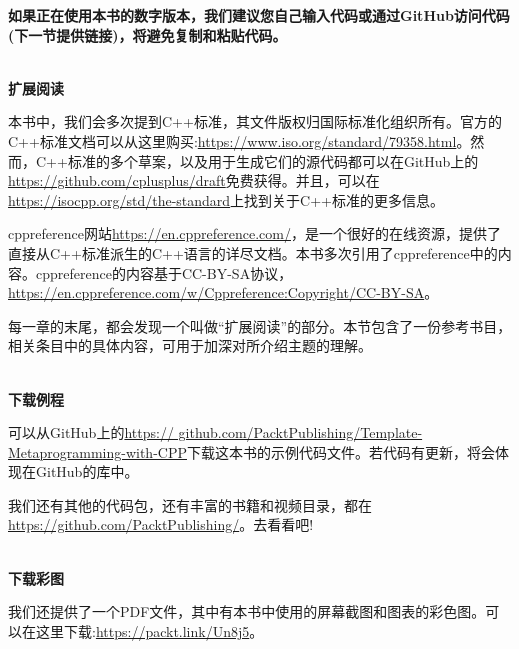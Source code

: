 \textbf{
如果正在使用本书的数字版本，我们建议您自己输入代码或通过GitHub访问代码(下一节提供链接)，将避免复制和粘贴代码。
}

\hspace*{\fill} \\ %
\noindent
\textbf{扩展阅读}

本书中，我们会多次提到C++标准，其文件版权归国际标准化组织所有。官方的C++标准文档可以从这里购买:\url{https://www.iso.org/standard/79358.html}。然而，C++标准的多个草案，以及用于生成它们的源代码都可以在GitHub上的\url{https://github.com/cplusplus/draft}免费获得。并且，可以在\url{https://isocpp.org/std/the-standard}上找到关于C++标准的更多信息。

cppreference网站\url{https://en.cppreference.com/}，是一个很好的在线资源，提供了直接从C++标准派生的C++语言的详尽文档。本书多次引用了cppreference中的内容。cppreference的内容基于CC-BY-SA协议，\url{https://en.cppreference.com/w/Cppreference:Copyright/CC-BY-SA}。

每一章的末尾，都会发现一个叫做“扩展阅读”的部分。本节包含了一份参考书目，相关条目中的具体内容，可用于加深对所介绍主题的理解。

\hspace*{\fill} \\ %
\noindent
\textbf{下载例程}

可以从GitHub上的\url{https:// github.com/PacktPublishing/Template-Metaprogramming-with-CPP}下载这本书的示例代码文件。若代码有更新，将会体现在GitHub的库中。

我们还有其他的代码包，还有丰富的书籍和视频目录，都在\url{https://github.com/PacktPublishing/}。去看看吧!


\hspace*{\fill} \\ %
\noindent
\textbf{下载彩图}

我们还提供了一个PDF文件，其中有本书中使用的屏幕截图和图表的彩色图。可以在这里下载:\url{https://packt.link/Un8j5}。








